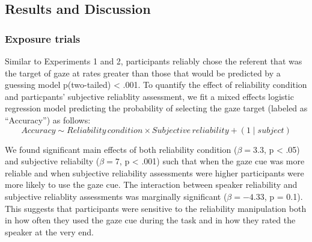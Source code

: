 \documentclass[a4paper,man,natbib]{apa6}
\begin{document}
\subsection{Results and Discussion}\label{results-and-discussion-2}

\subsubsection{Exposure trials}\label{exposure-trials-2}

Similar to Experiments 1 and 2, participants reliably chose the referent
that was the target of gaze at rates greater than those that would be
predicted by a guessing model p(two-tailed) \textless{} .001. To
quantify the effect of reliability condition and particpants' subjective
reliablity assessment, we fit a mixed effects logistic regression model
predicting the probability of selecting the gaze target (labeled as
``Accuracy'') as follows:
\[Accuracy  \sim Reliability \, condition \times Subjective \, reliability + (1 \mid subject)\]

\noindent We found significant main effects of both reliability
condition (\(\beta = 3.3\), p \textless{} .05) and subjective reliabilty
(\(\beta = 7\), p \textless{} .001) such that when the gaze cue was more
reliable and when subjective reliability assessments were higher
participants were more likely to use the gaze cue. The interaction
between speaker reliability and subjective reliablity assessments was
marginally significant (\(\beta = -4.33\), p = 0.1). This suggests that
participants were sensitive to the reliability manipulation both in how
often they used the gaze cue during the task and in how they rated the
speaker at the very end.
\end{document}
